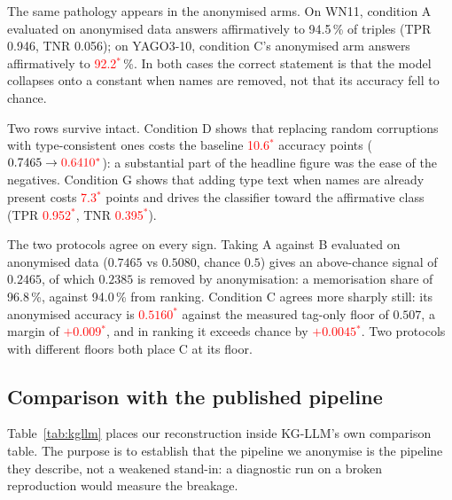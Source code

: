 \documentclass[conference]{IEEEtran}
\newcommand{\pv}[1]{\textcolor{red}{#1\ensuremath{^{\ast}}}}
\begin{document}
The same pathology appears in the anonymised arms. On WN11, condition A
evaluated on anonymised data answers affirmatively to 94.5\,\% of triples
(TPR 0.946, TNR 0.056); on YAGO3-10, condition C's anonymised arm answers
affirmatively to \pv{92.2}\,\%. In both cases the correct statement is that the
model collapses onto a constant when names are removed, not that its accuracy
fell to chance.

Two rows survive intact. Condition D shows that replacing random corruptions
with type-consistent ones costs the baseline \pv{10.6} accuracy points
($0.7465\rightarrow\pv{0.6410}$): a substantial part of the headline figure was
the ease of the negatives. Condition G shows that adding type text when names
are already present costs \pv{7.3} points and drives the classifier toward the
affirmative class (TPR \pv{0.952}, TNR \pv{0.395}).

The two protocols agree on every sign. Taking A against B evaluated on
anonymised data ($0.7465$ vs $0.5080$, chance $0.5$) gives an above-chance signal
of $0.2465$, of which $0.2385$ is removed by anonymisation: a memorisation share
of 96.8\,\%, against 94.0\,\% from ranking. Condition C agrees more sharply
still: its anonymised accuracy is \pv{$0.5160$} against the measured tag-only
floor of $0.507$, a margin of \pv{$+0.009$}, and in ranking it exceeds chance by
\pv{$+0.0045$}. Two protocols with different floors both place C at its floor.

\subsection{Comparison with the published pipeline}
\label{sec:kgllm}

Table~\ref{tab:kgllm} places our reconstruction inside KG-LLM's own comparison
table. The purpose is to establish that the pipeline we anonymise is the
pipeline they describe, not a weakened stand-in: a diagnostic run on a broken
reproduction would measure the breakage.
\end{document}
